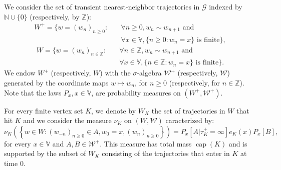 \documentclass[12pt,a4paper]{article}
\newcommand{\1}[1]{{\mathbf 1}{\{#1\}}}
\newcommand{\Z}{{\mathbb Z}}
\newcommand{\N}{{\mathbb N}}
\newcommand{\8}{{\infty}}
\newcommand{\capa}{\mathop{\mathrm{cap}}}
\begin{document}
We consider the set of transient nearest-neighbor trajectories in $\mathcal{G}$ indexed by $\N \cup \{0\}$ (respectively, by $\Z$):
\begin{equation}
\begin{aligned}
    W^+=\{ w=(w_n)_{n\ge 0} : \quad  & \forall n\ge 0, w_n \sim w_{n+1} \text{ and }  \\
    & \forall x \in \mathbb{V}, \{n \ge 0 :w_n=x\} \text{ is finite}\},
\end{aligned}
\end{equation}
\begin{equation}
\begin{aligned}
    W=\{ w=(w_n)_{n\in \Z} : \quad  & \forall n\in \Z, w_n \sim w_{n+1} \text{ and }  \\
    & \forall x \in \mathbb{V}, \{n \in \Z:w_n=x\} \text{ is finite}\}.
\end{aligned}
\end{equation}
We endow $W^+$ (respectively, $W$) with the $\sigma$-algebra $\mathcal{W^+}$ (respectively, $\mathcal{W}$) generated by the coordinate maps $w \mapsto w_n$, for $n\ge 0$ (respectively, for $n\in \Z$). Note that the laws $P_x, x\in \mathbb{V}$, are probability measures on $(W^+, \mathcal{W}^+)$.


\smallskip

For every finite vertex set $K$, we denote by $W_K$ the set of trajectories in $W$ that hit $K$ and we consider the measure $\nu_K$ on $(W, \mathcal{W})$ caracterized by:
\begin{equation}
\nu_K\left( \left\{ w\in W: (w_{-n})_{n\ge 0} \in A, w_0=x, (w_n)_{n\ge 0}  \right\} \right) 
 = P_x[A|\tau_K^+=\infty] e_K(x) P_x[B], 
\end{equation}
for every $x\in \mathbb{V}$ and $A, B \in \mathcal{W^+}$. This measure has total mass $\capa(K)$ and is supported by the subset of $W_K$ consisting of the trajectories that enter in $K$ at time $0$.
\end{document}
